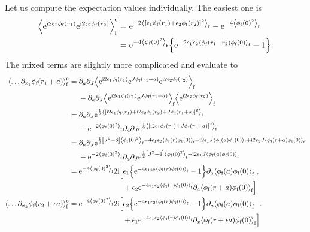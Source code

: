 \documentclass[english, parskip=full]{scrartcl}
\begin{document}
Let us compute the expectation values individually.
The easiest one is
\begin{align}
\bra*{\powe{\i 2\epsilon_1\phi_\f(r_1)} \powe{\i 2\epsilon_2\phi_\f(r_2)}}_\f^\c &= \powe{-2 \bra*{\klb*{\epsilon_1\phi_\f(r_1) + \epsilon_2\phi_\f(r_2)}^2}_\f} -\powe{-4\bra*{\phi_\f(0)^2}_\f} \\
&= \powe{-4\bra*{\phi_\f(0)^2}_\f} \klc*{\powe{-2\epsilon_1\epsilon_2 \bra*{\phi_\f(r_1-r_2) \phi_\f(0)}_\f} - 1}.
\end{align}
The mixed terms are slightly more complicated and evaluate to
\begin{align}
\bra*{\dots \partial_{x_1} \phi_\f(r_1+ a)}_\f^\c &= \bsplit{&\partial_a \partial_J \bra*{\powe{\i 2\epsilon_1\phi_\f(r_1)} \powe{J \phi_\f(r_1+ a)} \powe{\i 2\epsilon_2\phi_\f(r_2)}}_\f \\
&- \partial_a \partial_J \bra*{\powe{\i 2\epsilon_1\phi_\f(r_1)} \powe{J \phi_\f(r_1+ a)}}_\f \bra*{\powe{\i 2\epsilon_2\phi_\f(r_2)}}_\f}\\
&= \bsplit{& \partial_a \partial_J \powe{\frac{1}{2} \bra*{\klb*{\i 2\epsilon_1\phi_\f(r_1) + \i 2\epsilon_2\phi_\f(r_2) + J\phi_\f(r_1+a)}^2}_\f} \\
&- \powe{-2\bra*{\phi_\f(0)^2}_\f} \partial_a \partial_J \powe{\frac{1}{2} \bra*{\klb*{\i 2\epsilon_1 \phi_\f(r_1) + J\phi_\f(r_1+a)}^2}_\f}}\\
&= \bsplit{&\partial_a \partial_J \powe{\frac{1}{2} \klb*{J^2-8} \bra*{\phi_\f(0)^2}_\f - 4\epsilon_1\epsilon_2 \bra*{\phi_\f(r)\phi_\f(0)}_\f + \i 2\epsilon_1 J \bra*{\phi_\f(a) \phi_\f(0)}_\f + \i 2\epsilon_2 J \bra*{\phi_\f(r+a) \phi_\f(0)}_\f} \\
&- \powe{-2\bra*{\phi_\f(0)^2}_\f} \partial_a \partial_J \powe{\frac{1}{2} \klb*{J^2 - 4} \bra*{\phi_\f(0)^2}_\f + \i 2\epsilon_1 J\bra*{\phi_\f(a) \phi_\f(0)}_\f}}\\
&= \bsplit{\powe{-4\bra*{\phi_\f(0)^2}_\f} 2\i \klb[\Big]{&\epsilon_1 \klc*{\powe{-4\epsilon_1\epsilon_2 \bra*{\phi_\f(r) \phi_\f(0)}_\f} - 1} \partial_{a} \bra*{\phi_\f(a)\phi_\f(0)}_\f\\
& + \epsilon_2 \powe{-4\epsilon_1\epsilon_2 \bra*{\phi_\f(r) \phi_\f(0)}_\f} \partial_{a} \bra*{\phi_\f(r+a)\phi_\f(0)}_\f }},\\
\bra*{\dots \partial_{x_2} \phi_\f(r_2+ \epsilon a)}_\f^\c &= \bsplit{\powe{-4\bra*{\phi_\f(0)^2}_\f} 2\i \klb[\Big]{&\epsilon_2 \klc*{\powe{-4\epsilon_1\epsilon_2 \bra*{\phi_\f(r) \phi_\f(0)}_\f} - 1} \partial_{a} \bra*{\phi_\f(a)\phi_\f(0)}_\f\\
& + \epsilon_1 \powe{-4\epsilon_1\epsilon_2 \bra*{\phi_\f(r) \phi_\f(0)}_\f} \partial_{x} \bra*{\phi_\f(r+\epsilon a)\phi_\f(0)}_\f }}.
\end{align}
\end{document}
